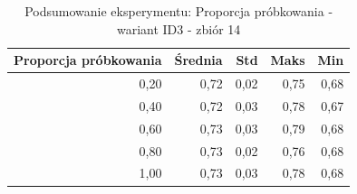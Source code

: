 \begin{table}[htbp]
\centering
\small
\setlength{\tabcolsep}{6pt}
\renewcommand{\arraystretch}{1.2}
\caption{Podsumowanie eksperymentu: Proporcja próbkowania - wariant ID3 - zbiór 14}
\label{tab:ID3_sample_ratio_14}
\begin{tabular}{r|r|r|r|r}
\toprule
Proporcja próbkowania & Średnia & Std & Maks & Min \\
\hline
0,20 & 0,72 & 0,02 & 0,75 & 0,68 \\
0,40 & 0,72 & 0,03 & 0,78 & 0,67 \\
0,60 & 0,73 & 0,03 & 0,79 & 0,68 \\
0,80 & 0,73 & 0,02 & 0,76 & 0,68 \\
1,00 & 0,73 & 0,03 & 0,78 & 0,68 \\
\bottomrule
\end{tabular}
\end{table}